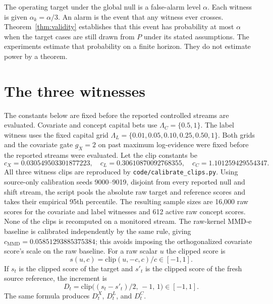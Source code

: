 \documentclass[11pt,a4paper]{article}
\theoremstyle{definition}
\newcommand{\1}{\mathbf{1}}
\begin{document}
The operating target under the global null is a false-alarm level \(\alpha\). Each witness is given \(\alpha_k=\alpha/3\). An alarm is the event that any witness ever crosses. Theorem~\ref{thm:validity} establishes that this event has probability at most \(\alpha\) when the target cases are still drawn from \(P\) under its stated assumptions. The experiments estimate that probability on a finite horizon. They do not estimate power by a theorem.

\section{The three witnesses}
\label{sec:witness}

The constants below are fixed before the reported controlled streams are evaluated. Covariate and concept capital bets use $\Lambda_C=\{0.5,1\}$. The label witness uses the fixed capital grid $\Lambda_L=\{0.01,0.05,0.10,0.25,0.50,1\}$. Both grids and the covariate gate $g_X=2$ on past maximum log-evidence were fixed before the reported streams were evaluated. Let the clip constants be
\begin{equation}
c_X=0.030549503301877223,\quad
c_L=0.30610870092768355,\quad
c_C=1.101259429554347.
\label{eq:clips}
\end{equation}
All three witness clips are reproduced by \texttt{code/calibrate\_clips.py}. Using source-only calibration seeds 9000--9019, disjoint from every reported null and shift stream, the script pools the absolute raw target and reference scores and takes their empirical 95th percentile. The resulting sample sizes are 16,000 raw scores for the covariate and label witnesses and 612 active raw concept scores. None of the clips is recomputed on a monitored stream. The raw-kernel MMD-e baseline is calibrated independently by the same rule, giving \(c_{\mathrm{MMD}}=0.05851293885375384\); this avoids imposing the orthogonalized covariate score's scale on the raw baseline. For a raw scalar \(u\) the clipped score is
\begin{equation}
s(u,c)=\mathrm{clip}(u,-c,c)/c\in[-1,1].
\label{eq:clip}
\end{equation}
If \(s_t\) is the clipped score of the target and \(s'_t\) is the clipped score of the fresh source reference, the increment is
\begin{equation}
D_t=\mathrm{clip}\big((s_t-s'_t)/2,\,-1,\,1\big)\in[-1,1].
\label{eq:D}
\end{equation}
The same formula produces \(D^X_t\), \(D^L_t\), and \(D^C_t\).
\end{document}
